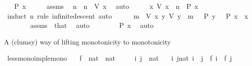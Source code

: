 \begin{isabellebody}
\ \ \ {\isachardoublequoteopen}P\ x{\isachardoublequoteclose}\isanewline
%
\isadelimproof
%
\endisadelimproof
%
\isatagproof
{}\isamarkupfalse%
\ {\isacharminus}{\kern0pt}\isanewline
\ \ \isamarkupfalse%
\ assms\ \isamarkupfalse%
\ n\ \ {\isachardoublequoteopen}n\ {\isacharequal}{\kern0pt}\ V\ x{\isachardoublequoteclose}\ \isamarkupfalse%
\ auto\isanewline
\ \ \isamarkupfalse%
\ \isamarkupfalse%
\ {\isachardoublequoteopen}{\isasymAnd}x{\isachardot}{\kern0pt}\ V\ x\ {\isacharequal}{\kern0pt}\ n\ {\isasymLongrightarrow}\ P\ x{\isachardoublequoteclose}\isanewline
\ \ \isamarkupfalse%
\ {\isacharparenleft}{\kern0pt}induct\ n\ rule{\isacharcolon}{\kern0pt}\ infinite{\isacharunderscore}{\kern0pt}descent{\isacharcomma}{\kern0pt}\ auto{\isacharparenright}{\kern0pt}\isanewline
\ \ \ \ \isamarkupfalse%
\ {\isachardoublequoteopen}{\isasymexists}m\ {\isacharless}{\kern0pt}\ V\ x{\isachardot}{\kern0pt}\ {\isasymexists}y{\isachardot}{\kern0pt}\ V\ y\ {\isacharequal}{\kern0pt}\ m\ {\isasymand}\ {\isasymnot}\ P\ y{\isachardoublequoteclose}\ \ {\isachardoublequoteopen}{\isasymnot}\ P\ x{\isachardoublequoteclose}\ \ x\isanewline
\ \ \ \ \ \ \isamarkupfalse%
\ assms\ \ that\ \isamarkupfalse%
\ auto\isanewline
\ \ \isamarkupfalse%
\isanewline
\ \ \isamarkupfalse%
\ \isamarkupfalse%
\ {\isachardoublequoteopen}P\ x{\isachardoublequoteclose}\ \isamarkupfalse%
\ auto\isanewline
{}\isamarkupfalse%
%
\endisatagproof
{\isafoldproof}%
%
\isadelimproof
%
\endisadelimproof
%
\begin{isamarkuptext}%
A (clumsy) way of lifting \isa{{\isacharless}{\kern0pt}} monotonicity to \isa{{\isasymle}} monotonicity%
\end{isamarkuptext}\isamarkuptrue%
\isamarkupfalse%
\ less{\isacharunderscore}{\kern0pt}mono{\isacharunderscore}{\kern0pt}imp{\isacharunderscore}{\kern0pt}le{\isacharunderscore}{\kern0pt}mono{\isacharcolon}{\kern0pt}\isanewline
\ \ \ f\ {\isacharcolon}{\kern0pt}{\isacharcolon}{\kern0pt}\ {\isachardoublequoteopen}nat\ {\isasymRightarrow}\ nat{\isachardoublequoteclose}\isanewline
\ \ \ \ \ i\ j\ {\isacharcolon}{\kern0pt}{\isacharcolon}{\kern0pt}\ nat\isanewline
\ \ \ {\isachardoublequoteopen}{\isasymAnd}i\ j{\isacharcolon}{\kern0pt}{\isacharcolon}{\kern0pt}nat{\isachardot}{\kern0pt}\ i\ {\isacharless}{\kern0pt}\ j\ {\isasymLongrightarrow}\ f\ i\ {\isacharless}{\kern0pt}\ f\ j{\isachardoublequoteclose}\isanewline

\end{isabellebody}
